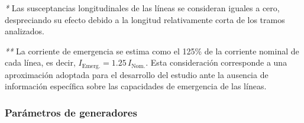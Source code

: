 \documentclass[12pt]{article}
\begin{document}
\vspace{-0.2cm}
\begin{flushleft}
\scriptsize
\textit{*} Las susceptancias longitudinales de las líneas se consideran iguales a cero, 
despreciando su efecto debido a la longitud relativamente corta de los tramos analizados.

\textit{**} La corriente de emergencia se estima como el 125\% de la corriente nominal 
de cada línea, es decir, $I_{\mathrm{Emerg.}}=1.25\,I_{\mathrm{Nom.}}$. Esta consideración 
corresponde a una aproximación adoptada para el desarrollo del estudio ante la ausencia 
de información específica sobre las capacidades de emergencia de las líneas.
\end{flushleft}
\subsubsection{Parámetros de generadores}
\end{document}
